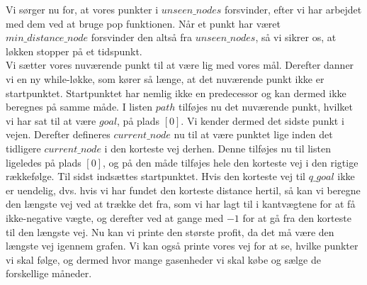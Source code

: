 Vi sørger nu for, at vores punkter i $unseen\_nodes$ forsvinder, efter vi har arbejdet med dem ved at bruge pop funktionen. Når et punkt har været $min\_distance\_node$ forsvinder den altså fra $unseen\_nodes$, så vi sikrer os, at løkken stopper på et tidspunkt. \\
Vi sætter vores nuværende punkt til at være lig med vores mål.
Derefter danner vi en ny while-løkke, som kører så længe, at det nuværende punkt ikke er startpunktet. Startpunktet har nemlig ikke en predecessor og kan dermed ikke beregnes på samme måde. I listen $path$ tilføjes nu det nuværende punkt, hvilket vi har sat til at være $goal$, på plads $[0]$. Vi kender dermed det sidste punkt i vejen. Derefter defineres $current\_node$ nu til at være punktet lige inden det tidligere $current\_node$ i den korteste vej derhen. Denne tilføjes nu til listen ligeledes på plads $[0]$, og på den måde tilføjes hele den korteste vej i den rigtige rækkefølge. Til sidst indsættes startpunktet.
Hvis den korteste vej til $q\_goal$ ikke er uendelig, dvs. hvis vi har fundet den korteste distance hertil, så kan vi beregne den længste vej ved at trække det fra, som vi har lagt til i kantvægtene for at få ikke-negative vægte, og derefter ved at gange med $-1$ for at gå fra den korteste til den længste vej. 
Nu kan vi printe den største profit, da det må være den længste vej igennem grafen. Vi kan også printe vores vej for at se, hvilke punkter vi skal følge, og dermed hvor mange gasenheder vi skal købe og sælge de forskellige måneder.

